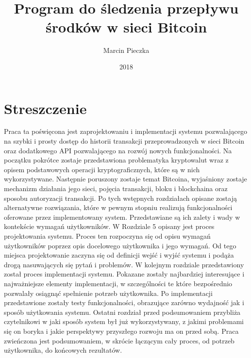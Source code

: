 \documentclass[12pt, en, eng, oneside, final]{mgr}
\begin{document}
\title{Program do śledzenia przepływu środków w sieci Bitcoin}
\date{2018}
\author{Marcin Pieczka}
\maketitle

\tableofcontents

\pagebreak 

\section*{Streszczenie}
Praca ta poświęcona jest zaprojektowaniu i implementacji systemu pozwalającego na szybki i prosty dostęp do historii transakcji przeprowadzonych w sieci Bitcoin oraz dodatkowego API pozwalającego na rozwój nowych funkcjonalności. Na początku pokrótce zostaje przedstawiona problematyka kryptowalut wraz z opisem podstawowych operacji kryptograficznych, które są w nich wykorzystywane. Następnie poruszony zostaje temat Bitcoina, wyjaśniony zostaje mechanizm działania jego sieci, pojęcia transakcji, bloku i blockchaina oraz sposobu autoryzacji transakcji. Po tych wstępnych rozdziałach opisane zostają alternatywne rozwiązania, które w pewnym stopniu realizują funkcjonalności oferowane przez implementowany system. Przedstawiane są ich zalety i wady w kontekście wymagań użytkowników. W Rozdziale 5 opisany jest proces projektowania systemu. Proces ten rozpoczyna się od opisu wymagań użytkowników poprzez opis docelowego użytkownika i jego wymagań. Od tego miejsca projektowanie zaczyna się od definicji wejść i wyjść systemu i podąża drogą nasuwających się pytań i problemów. W kolejnym rozdziale przedstawiony został proces implementacji systemu. Pokazane zostały najbardziej interesujące i najważniejsze elementy implementacji, w szczególności te które bezpośrednio pozwalały osiągnąć spełnienie potrzeb użytkownika. Po implementacji przedstawione zostały testy funkcjonalności, obrazujące zarówno wydajność jak i sposób użytkowania systemu. Ostatni rozdział przed podsumowaniem przybliża czytelnikowi w jaki sposób system był już wykorzystywany, z jakimi problemami się on boryka i jakie perspektywy przyszłego rozwoju ma on przed sobą. Praca zwieńczona jest podsumowaniem, w skrócie łączącym cały proces, od potrzeb użytkownika, do końcowych rezultatów. 
\end{document}
